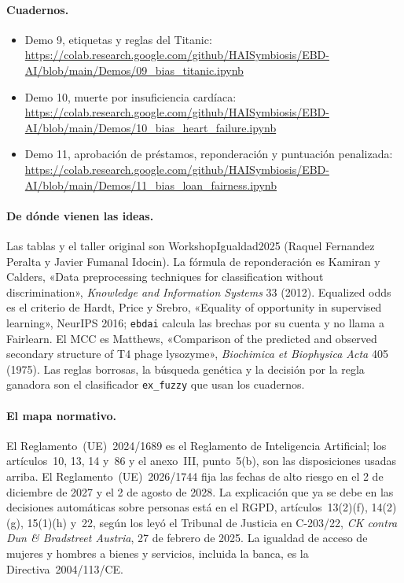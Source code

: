 \documentclass[11pt]{article}
\newcommand{\fn}[1]{\texttt{\small #1}}
\begin{document}
{\small
{}
\paragraph{Cuadernos.}
\begin{itemize}[itemsep=0.2em]
  \item Demo 9, etiquetas y reglas del Titanic:\\
  {\footnotesize\url{https://colab.research.google.com/github/HAISymbiosis/EBD-AI/blob/main/Demos/09_bias_titanic.ipynb}}
  \item Demo 10, muerte por insuficiencia cardíaca:\\
  {\footnotesize\url{https://colab.research.google.com/github/HAISymbiosis/EBD-AI/blob/main/Demos/10_bias_heart_failure.ipynb}}
  \item Demo 11, aprobación de préstamos, reponderación y puntuación penalizada:\\
  {\footnotesize\url{https://colab.research.google.com/github/HAISymbiosis/EBD-AI/blob/main/Demos/11_bias_loan_fairness.ipynb}}
\end{itemize}

\paragraph{De dónde vienen las ideas.}
Las tablas y el taller original son WorkshopIgualdad2025 (Raquel Fernandez Peralta y Javier Fumanal Idocin). La fórmula de reponderación es Kamiran y Calders, «Data preprocessing techniques for classification without discrimination», \emph{Knowledge and Information Systems} 33 (2012). Equalized odds es el criterio de Hardt, Price y Srebro, «Equality of opportunity in supervised learning», NeurIPS 2016; \fn{ebdai} calcula las brechas por su cuenta y no llama a Fairlearn. El MCC es Matthews, «Comparison of the predicted and observed secondary structure of T4 phage lysozyme», \emph{Biochimica et Biophysica Acta} 405 (1975). Las reglas borrosas, la búsqueda genética y la decisión por la regla ganadora son el clasificador \fn{ex\_fuzzy} que usan los cuadernos.

\paragraph{El mapa normativo.}
El Reglamento~(UE)~2024/1689 es el Reglamento de Inteligencia Artificial; los artículos~10, 13, 14 y~86 y el anexo~III, punto~5(b), son las disposiciones usadas arriba. El Reglamento~(UE)~2026/1744 fija las fechas de alto riesgo en el 2 de diciembre de 2027 y el 2 de agosto de 2028. La explicación que ya se debe en las decisiones automáticas sobre personas está en el RGPD, artículos~13(2)(f), 14(2)(g), 15(1)(h) y~22, según los leyó el Tribunal de Justicia en C-203/22, \emph{CK contra Dun \& Bradstreet Austria}, 27 de febrero de 2025. La igualdad de acceso de mujeres y hombres a bienes y servicios, incluida la banca, es la Directiva~2004/113/CE.
}
\end{document}
